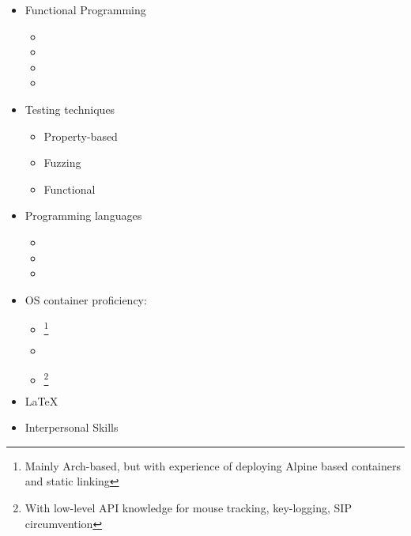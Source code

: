 \documentclass{CurriculumVitae}[10pt, condensed]
\begin{document}
\begin{multicols}{4}
\begin{itemize}[topsep=0pt]
\begin{itemize}[topsep=0pt, partopsep=0pt]
    \item {}
    \item {}
    \item {}
    \end{itemize}
  \item {\footnotesize Functional Programming}
    \begin{itemize}[topsep=0pt, partopsep=0pt]
      \setlength{\itemsep}{-0.3em}
    \item {}
    \item {}
    \item {}
    \item {}
    \end{itemize}
  \item {\footnotesize Testing techniques}
    \begin{itemize}[topsep=0pt, partopsep=0pt]
      \setlength{\itemsep}{-0.3em}
    \item {\footnotesize Property-based}
    \item {\footnotesize Fuzzing}
    \item {\footnotesize Functional}
    \end{itemize}
  \item {\footnotesize Programming languages}
    \begin{itemize}[topsep=0pt, partopsep=0pt]
      \setlength{\itemsep}{-0.3em}
    \item {}
    \item {}
    \item {}
    \end{itemize}
  \item {\footnotesize OS container proficiency:}
    \begin{itemize}[topsep=0pt, partopsep=0pt]
      \setlength{\itemsep}{-0.3em}
    \item {}\footnote{Mainly Arch-based, but with experience
        of deploying Alpine based containers and static linking}
    \item {}
    \item {}\footnote{With low-level API knowledge for
        mouse tracking, key-logging, SIP circumvention}
    \end{itemize}
  \item {\footnotesize \LaTeX{}}
  \item {\footnotesize Interpersonal Skills}
    \begin{itemize}[topsep=0pt, partopsep=0pt]

\end{itemize}
\end{itemize}
\end{multicols}
\end{document}
